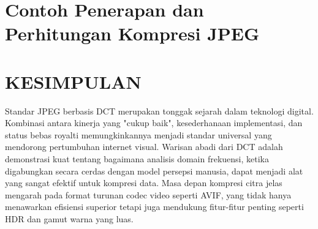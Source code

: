 \documentclass[a4paper]{article}
\begin{document}
\begin{table}[h!]
  \centering
  \caption{Perbandingan Kualitas vs. Tingkat Kompresi JPEG}
  \label{tab:kualitas_jpeg}
\end{table}

\section{Contoh Penerapan dan Perhitungan Kompresi JPEG}


\section{KESIMPULAN}
Standar JPEG berbasis DCT merupakan tonggak sejarah dalam teknologi digital. Kombinasi antara kinerja yang "cukup baik", kesederhanaan implementasi, dan status bebas royalti memungkinkannya menjadi standar universal yang mendorong pertumbuhan internet visual. Warisan abadi dari DCT adalah demonstrasi kuat tentang bagaimana analisis domain frekuensi, ketika digabungkan secara cerdas dengan model persepsi manusia, dapat menjadi alat yang sangat efektif untuk kompresi data. Masa depan kompresi citra jelas mengarah pada format turunan codec video seperti AVIF, yang tidak hanya menawarkan efisiensi superior tetapi juga mendukung fitur-fitur penting seperti HDR dan gamut warna yang luas.

\printbibliography
\end{document}
